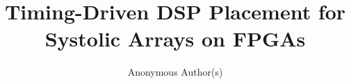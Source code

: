 \documentclass[sigconf,nonacm]{acmart}
\title{Timing-Driven DSP Placement for Systolic Arrays on FPGAs}
\author{Anonymous Author(s)}
\affiliation{%
  \institution{Anonymous Institution}
  \city{Anonymous City}
  \country{Anonymous Country}
}
\begin{document}
\begin{abstract}

\end{abstract}

\maketitle











\end{document}
